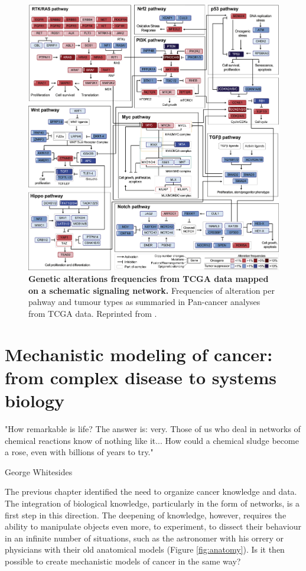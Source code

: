 \documentclass[a4paper,12pt,twoside,onecolumn,openright,final,oldfontcommands]{memoir}
\newcommand{\initial}[1]{
	\lettrine[lines=3,lhang=0.33,nindent=0em]{
		\color{gray}
     		{\textsc{#1}}}{}}
\begin{document}
\begin{figure}

{\centering \includegraphics[width=0.9\linewidth]{fig/pathways} 

}

\caption[Genetic alterations frequencies from TCGA data mapped on a schematic signaling network]{\textbf{Genetic alterations frequencies from TCGA
data mapped on a schematic signaling network.} Frequencies of alteration
per pahway and tumour types as summaried in Pan-cancer analyses from
TCGA data. Reprinted from \citet{sanchez2018oncogenic}.}\label{fig:pathways}
\end{figure}






\chapter{Mechanistic modeling of cancer: from complex disease to systems
biology}\label{mechanistic-modeling-of-cancer-from-complex-disease-to-systems-biology}

\epigraph{"How remarkable is life? The answer is: very. Those of us who deal in networks of chemical reactions know of nothing like it... How could a chemical sludge become a rose, even with billions of years to try."}{George Whitesides}

\initial{T}he previous chapter identified the need to organize cancer
knowledge and data. The integration of biological knowledge,
particularly in the form of networks, is a first step in this direction.
The deepening of knowledge, however, requires the ability to manipulate
objects even more, to experiment, to dissect their behaviour in an
infinite number of situations, such as the astronomer with his orrery or
physicians with their old anatomical models (Figure \ref{fig:anatomy}).
Is it then possible to create mechanistic models of cancer in the same
way?
\end{document}
